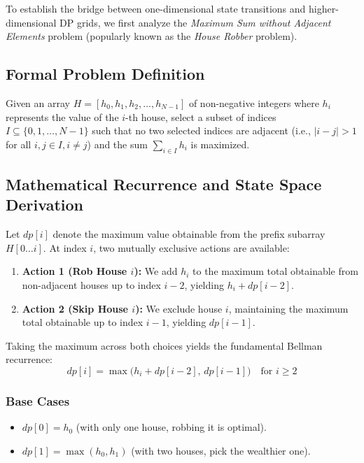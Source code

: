 \documentclass[10pt,journal,compsoc,onecolumn]{IEEEtran}
\begin{document}
To establish the bridge between one-dimensional state transitions and higher-dimensional DP grids, we first analyze the \emph{Maximum Sum without Adjacent Elements} problem (popularly known as the \emph{House Robber} problem).

\subsection{Formal Problem Definition}

Given an array $H = [h_0, h_1, h_2, \dots, h_{N-1}]$ of non-negative integers where $h_i$ represents the value of the $i$-th house, select a subset of indices $I \subseteq \{0, 1, \dots, N-1\}$ such that no two selected indices are adjacent (i.e., $|i - j| > 1$ for all $i, j \in I, i \neq j$) and the sum $\sum_{i \in I} h_i$ is maximized.

\subsection{Mathematical Recurrence and State Space Derivation}

Let $dp[i]$ denote the maximum value obtainable from the prefix subarray $H[0 \dots i]$. At index $i$, two mutually exclusive actions are available:
\begin{enumerate}
    \item \textbf{Action 1 (Rob House $i$):} We add $h_i$ to the maximum total obtainable from non-adjacent houses up to index $i-2$, yielding $h_i + dp[i-2]$.
    \item \textbf{Action 2 (Skip House $i$):} We exclude house $i$, maintaining the maximum total obtainable up to index $i-1$, yielding $dp[i-1]$.
\end{enumerate}

Taking the maximum across both choices yields the fundamental Bellman recurrence:
\begin{equation}
dp[i] = \max\Big(h_i + dp[i-2], \, dp[i-1]\Big) \quad \text{for } i \ge 2
\label{eq:house-robber-rec}
\end{equation}

\subsubsection{Base Cases}
\begin{itemize}
    \item $dp[0] = h_0$ (with only one house, robbing it is optimal).
    \item $dp[1] = \max(h_0, h_1)$ (with two houses, pick the wealthier one).
\end{itemize}
\end{document}
